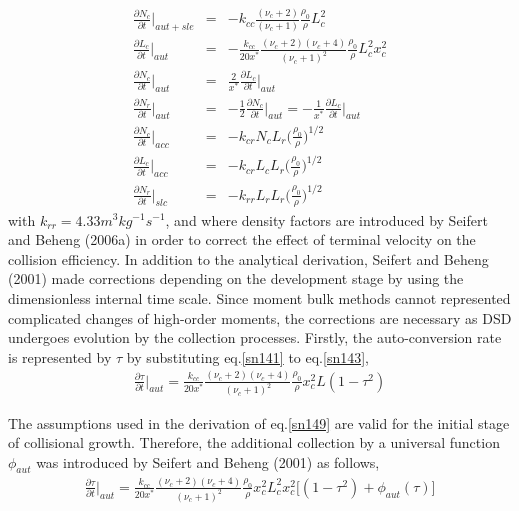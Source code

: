 \begin{eqnarray}
\frac{\partial N_{c}}{\partial t}\Bigr|_{aut+sle}&=&-k_{cc}\frac{(\nu_{c}+2)}{(\nu_{c}+1)}\frac{\rho_{0}}{\rho}L_{c}^{2}\label{sn142}\\
\frac{\partial L_{c}}{\partial t}\Bigr|_{aut}&=&-\frac{k_{cc}}{20x^{*}}\frac{(\nu_{c}+2)(\nu_{c}+4)}{(\nu_{c}+1)^{2}}\frac{\rho_{0}}{\rho}L_{c}^{2}x_{c}^{2}\label{sn143}\\
\frac{\partial N_{c}}{\partial t}\Bigr|_{aut}&=&\frac{2}{x^{*}}\frac{\partial L_{c}}{\partial t}\Bigr|_{aut}\label{sn144}\\
\frac{\partial N_{r}}{\partial t}\Bigr|_{aut}&=&-\frac{1}{2}\frac{\partial N_{c}}{\partial t}\Bigr|_{aut}=-\frac{1}{x^{*}}\frac{\partial L_{c}}{\partial t}\Bigr|_{aut}\label{sn145}\\
\frac{\partial N_{c}}{\partial t}\Bigr|_{acc}&=&-k_{cr}N_{c}L_{r}\bigl(\frac{\rho_{0}}{\rho}\bigr)^{1/2}\label{sn146}\\
\frac{\partial L_{c}}{\partial t}\Bigr|_{acc}&=&-k_{cr}L_{c}L_{r}\bigl(\frac{\rho_{0}}{\rho}\bigr)^{1/2}\label{sn147}\\
\frac{\partial N_{r}}{\partial t}\Bigr|_{slc}&=&-k_{rr}L_{r}L_{r}\bigl(\frac{\rho_{0}}{\rho}\bigr)^{1/2}\label{sn148}
\end{eqnarray}
with $k_{rr} = 4.33 m^{3}kg^{-1}s^{-1}$, and where density factors are introduced by Seifert and Beheng (2006a) in order to correct the effect of terminal velocity on the collision efficiency. In addition to the analytical derivation, Seifert and Beheng (2001) made corrections depending on the development stage by using the dimensionless internal time scale. Since moment bulk methods cannot represented complicated changes of high-order moments, the corrections are necessary as DSD undergoes evolution by the collection processes. Firstly, the auto-conversion rate is represented by $\tau$ by substituting eq.\ref{sn141} to eq.\ref{sn143},
\begin{eqnarray}
\frac{\partial \tau}{\partial t}\Bigr|_{aut}=\frac{k_{cc}}{20x^{*}}\frac{(\nu_{c}+2)(\nu_{c}+4)}{(\nu_{c}+1)^{2}}\frac{\rho_{0}}{\rho}x_{c}^{2}L(1-\tau^{2})\label{sn149}
\end{eqnarray}

The assumptions used in the derivation of eq.\ref{sn149} are valid for the initial stage of collisional growth. Therefore, the additional collection by a universal function $\phi_{aut}$ was introduced by Seifert and Beheng (2001) as follows,
\begin{eqnarray}
\frac{\partial \tau}{\partial t}\Bigr|_{aut}=\frac{k_{cc}}{20x^{*}}\frac{(\nu_{c}+2)(\nu_{c}+4)}{(\nu_{c}+1)^{2}}\frac{\rho_{0}}{\rho}x_{c}^{2}L_{c}^{2}x_{c}^{2}\bigl[(1-\tau^{2})+\phi_{aut}(\tau)\bigr]\label{sn150}
\end{eqnarray}

